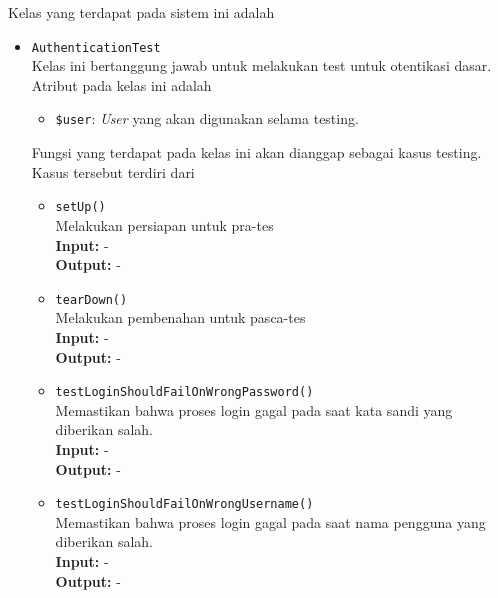     Kelas yang terdapat pada sistem ini adalah
    \begin{itemize}
        \item \texttt{AuthenticationTest} \\
            Kelas ini bertanggung jawab untuk melakukan test untuk otentikasi
            dasar. Atribut pada kelas ini adalah
            \begin{itemize}
                \item \texttt{\$user}: \textit{User} yang akan digunakan selama
                testing.
            \end{itemize}
            Fungsi yang terdapat pada kelas ini akan dianggap sebagai kasus
            testing. Kasus tersebut terdiri dari
            \begin{itemize}
                \item \texttt{setUp()} \\
                    Melakukan persiapan untuk pra-tes \\
                    \textbf{Input:} -\\
                    \textbf{Output:} -
                
                \item \texttt{tearDown()} \\
                    Melakukan pembenahan untuk pasca-tes \\
                    \textbf{Input:} - \\
                    \textbf{Output:} -
                
                \item \texttt{testLoginShouldFailOnWrongPassword()} \\
                    Memastikan bahwa proses login gagal pada saat kata sandi
                    yang diberikan salah. \\
                    \textbf{Input:} - \\
                    \textbf{Output:} -
                
                \item \texttt{testLoginShouldFailOnWrongUsername()} \\
                    Memastikan bahwa proses login gagal pada saat nama pengguna
                    yang diberikan salah. \\
                    \textbf{Input:} - \\
                    \textbf{Output:} -
                

\end{itemize}
\end{itemize}
